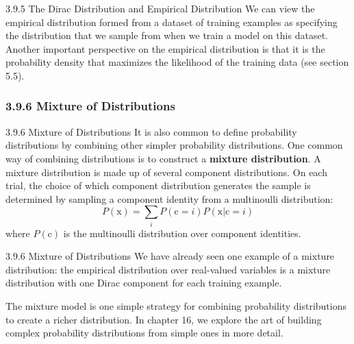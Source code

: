 \begin{frame}{3.9.5 The Dirac Distribution and Empirical Distribution}
    \justifying
    We can view the empirical distribution formed from a dataset of training examples as specifying the distribution that we sample from when we train a model on this dataset. Another important perspective on the empirical distribution is that it is the probability density that maximizes the likelihood of the training data (see section 5.5).
\end{frame}

\subsubsection{3.9.6 Mixture of Distributions}
\begin{frame}{3.9.6 Mixture of Distributions}
    \justifying
    It is also common to define probability distributions by combining other simpler probability distributions. One common way of combining distributions is to construct a \textbf{mixture distribution}. A mixture distribution is made up of several component distributions. On each trial, the choice of which component distribution generates the sample is determined by sampling a component identity from a multinoulli distribution:
    \begin{equation}
        P(\mathrm{x}) = \sum_{i} P(\mathrm{c} = i) P(\mathrm{x} | \mathrm{c} = i)
        \label{eq:3_29}
    \end{equation}
    where $P(\mathrm{c})$ is the multinoulli distribution over component identities.
\end{frame}

\begin{frame}{3.9.6 Mixture of Distributions}
    \justifying
    We have already seen one example of a mixture distribution: the empirical distribution over real-valued variables is a mixture distribution with one Dirac component for each training example.
    
    The mixture model is one simple strategy for combining probability distributions to create a richer distribution. In chapter 16, we explore the art of building complex probability distributions from simple ones in more detail.
\end{frame}

